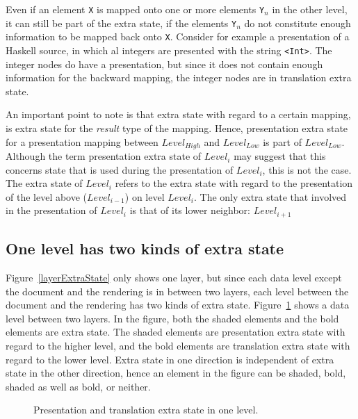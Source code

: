 
Even if an element \verb|X| is mapped onto one or more elements \verb|Y|$_n$  in the other level, it can still be part of the extra state, if the elements \verb|Y|$_n$ do not constitute enough information to be mapped back onto \verb|X|. Consider for example a presentation of a Haskell source, in which al integers are presented with the string \verb|<Int>|. The integer nodes do have a presentation, but since it does not contain enough information for the backward mapping, the integer nodes are in translation extra state.  

An important point to note is that extra state with regard to a certain mapping, is extra state for the {\em result} type of the mapping. Hence, presentation extra state for a presentation mapping between $Level_{High}$ and $Level_{Low}$ is part of $Level_{Low}$. Although the term presentation extra state of $Level_i$ may suggest that this concerns state that is used during the presentation of $Level_i$, this is not the case. The extra state of $Level_i$ refers to the extra state with regard to the presentation of the level above ($Level_{i-1}$) on level $Level_i$. The only extra state that involved in the presentation of $Level_i$ is that of its lower neighbor: $Level_{i+1}$


%																
\subsection{One level has two kinds of extra state}

Figure~\ref{layerExtraState} only shows one layer, but since each data level except the document and the rendering is in between two layers, each level between the document and the rendering has two kinds of extra state. Figure~\ref{levelExtraState} shows a data level between two layers. In the figure, both the shaded elements and the bold elements are extra state. The shaded elements are presentation extra state with regard to the higher level, and the bold elements are translation extra state with regard to the lower level. Extra state in one direction is independent of extra state in the other direction, hence an element in the figure can be shaded, bold, shaded as well as bold, or neither. 

\begin{figure}
\begin{center}
\begin{center}
\end{center}
\caption{Presentation and translation extra state in one level.}\label{levelExtraState} 
\end{center}
\end{figure}

